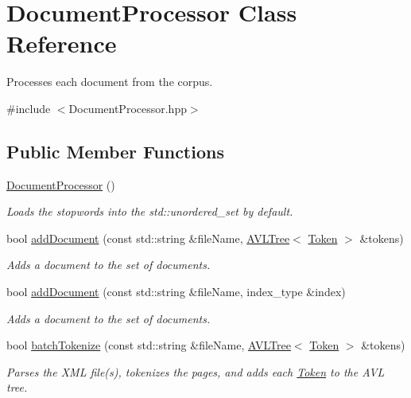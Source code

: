\hypertarget{class_document_processor}{}\section{Document\+Processor Class Reference}
\label{class_document_processor}


Processes each document from the corpus.  




{\ttfamily \#include $<$Document\+Processor.\+hpp$>$}

\subsection*{Public Member Functions}
\begin{DoxyCompactItemize}
\item 
\hyperlink{class_document_processor_a4a4cefc8163b834855aa0cd0aec68d86}{Document\+Processor} ()
\begin{DoxyCompactList}\small\item\em Loads the stopwords into the std\+::unordered\+\_\+set by default. \end{DoxyCompactList}\item 
bool \hyperlink{class_document_processor_aa04641c8135b87e07ccb2b73283938ba}{add\+Document} (const std\+::string \&file\+Name, \hyperlink{class_a_v_l_tree}{A\+V\+L\+Tree}$<$ \hyperlink{class_token}{Token} $>$ \&tokens)
\begin{DoxyCompactList}\small\item\em Adds a document to the set of documents. \end{DoxyCompactList}\item 
bool \hyperlink{class_document_processor_a3f1563705a88a8ab9ea63af0a929917c}{add\+Document} (const std\+::string \&file\+Name, index\+\_\+type \&index)
\begin{DoxyCompactList}\small\item\em Adds a document to the set of documents. \end{DoxyCompactList}\item 
bool \hyperlink{class_document_processor_a9fc30d3b7c2220c86cd4b672c512b109}{batch\+Tokenize} (const std\+::string \&file\+Name, \hyperlink{class_a_v_l_tree}{A\+V\+L\+Tree}$<$ \hyperlink{class_token}{Token} $>$ \&tokens)
\begin{DoxyCompactList}\small\item\em Parses the X\+M\+L file(s), tokenizes the pages, and adds each \hyperlink{class_token}{Token} to the A\+V\+L tree. \end{DoxyCompactList}\item 

\end{DoxyCompactItemize}

